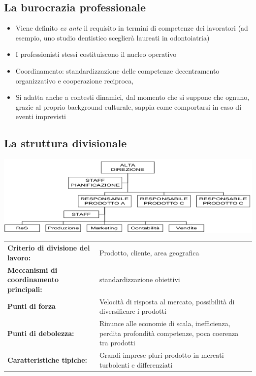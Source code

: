 \subsection{La burocrazia professionale}
\begin{itemize}
	\item Viene definito \textit{ex ante} il requisito in termini di competenze
	dei lavoratori (ad esempio, uno studio dentistico sceglierà
	laureati in odontoiatria)
	\item I professionisti stessi costituiscono il nucleo operativo
	\item Coordinamento: standardizzazione delle competenze
	decentramento organizzativo e cooperazione reciproca,
	\item Si adatta anche a contesti dinamici, dal momento che si
	suppone che ognuno, grazie al proprio background culturale,
	sappia come comportarsi in caso di eventi imprevisti
\end{itemize}

\subsection{La struttura divisionale}
\begin{center}
	\includegraphics[width=0.5\linewidth]{images/struttura_divisionale}
\end{center}

\begin{tabular}{>{\bfseries}l p{90mm}}
	Criterio di divisione del lavoro: & Prodotto, cliente, area geografica
\\
	Meccanismi di coordinamento principali: & standardizzazione obiettivi \\
	Punti di forza & Velocità di risposta al mercato, possibilità di
	diversificare i prodotti
\\
	Punti di debolezza: & Rinunce alle economie di scala, inefficienza,
	perdita profondità competenze, poca coerenza tra prodotti\\
	Caratteristiche tipiche: & Grandi imprese pluri-prodotto in mercati
	turbolenti e differenziati\\
\end{tabular}

